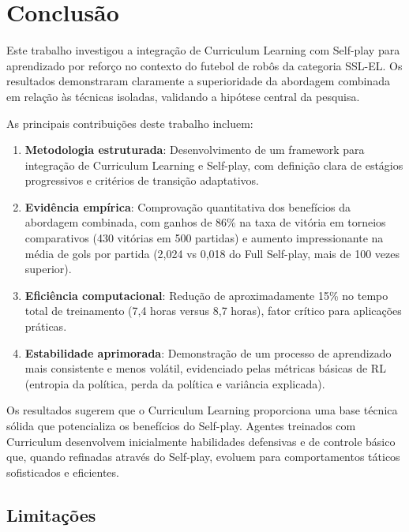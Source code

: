\chapter{Conclusão}
\label{cap:conclusao}

Este trabalho investigou a integração de Curriculum Learning com Self-play para aprendizado por reforço no contexto do futebol de robôs da categoria SSL-EL. Os resultados demonstraram claramente a superioridade da abordagem combinada em relação às técnicas isoladas, validando a hipótese central da pesquisa.

As principais contribuições deste trabalho incluem:

\begin{enumerate}
    \item \textbf{Metodologia estruturada}: Desenvolvimento de um framework para integração de Curriculum Learning e Self-play, com definição clara de estágios progressivos e critérios de transição adaptativos.
    
    \item \textbf{Evidência empírica}: Comprovação quantitativa dos benefícios da abordagem combinada, com ganhos de 86\% na taxa de vitória em torneios comparativos (430 vitórias em 500 partidas) e aumento impressionante na média de gols por partida (2,024 vs 0,018 do Full Self-play, mais de 100 vezes superior).
    
    \item \textbf{Eficiência computacional}: Redução de aproximadamente 15\% no tempo total de treinamento (7,4 horas versus 8,7 horas), fator crítico para aplicações práticas.
    
    \item \textbf{Estabilidade aprimorada}: Demonstração de um processo de aprendizado mais consistente e menos volátil, evidenciado pelas métricas básicas de RL (entropia da política, perda da política e variância explicada).
\end{enumerate}

Os resultados sugerem que o Curriculum Learning proporciona uma base técnica sólida que potencializa os benefícios do Self-play. Agentes treinados com Curriculum desenvolvem inicialmente habilidades defensivas e de controle básico que, quando refinadas através do Self-play, evoluem para comportamentos táticos sofisticados e eficientes.

\section{Limitações}

